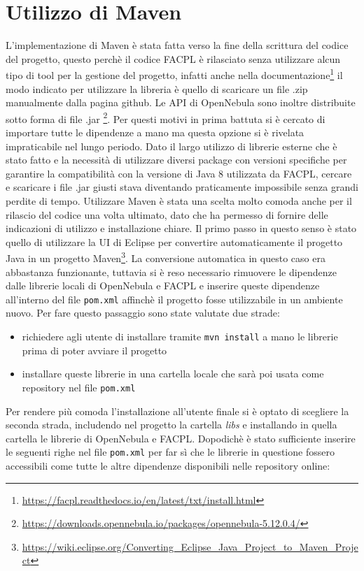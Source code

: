 \section{Utilizzo di Maven} \label{sec:maven}
L'implementazione di Maven\cite{maven} è stata fatta verso la fine della scrittura del codice del progetto, questo perchè il codice FACPL è rilasciato senza utilizzare alcun tipo di tool per la gestione del progetto, infatti anche nella documentazione\footnote{\url{https://facpl.readthedocs.io/en/latest/txt/install.html}} il modo indicato per utilizzare la libreria è quello di scaricare un file .zip manualmente dalla pagina github\cite{facpl-github}. Le API di OpenNebula sono inoltre distribuite sotto forma di file .jar \footnote{\url{https://downloads.opennebula.io/packages/opennebula-5.12.0.4/}}. Per questi motivi in prima battuta si è cercato di importare tutte le dipendenze a mano ma questa opzione si è rivelata impraticabile nel lungo periodo. Dato il largo utilizzo di librerie esterne che è stato fatto e la necessità di utilizzare diversi package con versioni specifiche per garantire la compatibilità con la versione di Java 8 utilizzata da FACPL, cercare e scaricare i file .jar giusti stava diventando praticamente impossibile senza grandi perdite di tempo.\medbreak
Utilizzare Maven è stata una scelta molto comoda anche per il rilascio del codice una volta ultimato, dato che ha permesso di fornire delle indicazioni di utilizzo e installazione chiare.\medbreak
Il primo passo in questo senso è stato quello di utilizzare la UI di Eclipse per convertire automaticamente il progetto Java in un progetto Maven\footnote{\url{https://wiki.eclipse.org/Converting_Eclipse_Java_Project_to_Maven_Project}}. La conversione automatica in questo caso era abbastanza funzionante, tuttavia si è reso necessario rimuovere le dipendenze dalle librerie locali di OpenNebula e FACPL e inserire queste dipendenze all'interno del file \texttt{pom.xml} affinchè il progetto fosse utilizzabile in un ambiente nuovo. Per fare questo passaggio sono state valutate due strade:
\begin{itemize}
    \item richiedere agli utente di installare tramite \texttt{mvn install} a mano le librerie prima di poter avviare il progetto
    \item installare queste librerie in una cartella locale che sarà poi usata come repository nel file \texttt{pom.xml}
\end{itemize}
Per rendere più comoda l'installazione all'utente finale si è optato di scegliere la seconda strada, includendo nel progetto la cartella \emph{libs} e installando in quella cartella le librerie di OpenNebula e FACPL. Dopodichè è stato sufficiente inserire le seguenti righe nel file \texttt{pom.xml} per far sì che le librerie in questione fossero accessibili come tutte le altre dipendenze disponibili nelle repository online:
